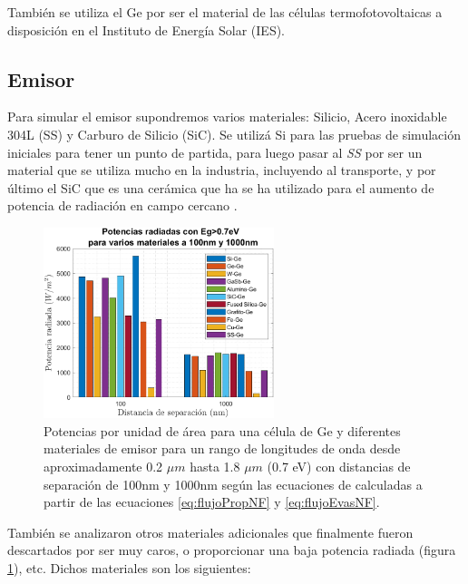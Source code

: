 También se utiliza el Ge por ser el material de las células termofotovoltaicas a disposición en el Instituto de Energía Solar (IES).
\subsection{Emisor}
Para simular el emisor supondremos varios materiales: Silicio, Acero inoxidable 304L (SS) y Carburo de Silicio (SiC). Se utilizá Si para las pruebas de simulación iniciales para tener un punto de partida, para luego pasar al \textit{SS} por ser un material que se utiliza mucho en la industria, incluyendo al transporte, y por último el SiC que es una cerámica que ha se ha utilizado para el aumento de potencia de radiación en campo cercano \cite{doi:Near_field_ThinFilm}.
\begin{figure}[H]
	\centering
		\includegraphics[width=0.6\textwidth]{figuras/rad_mat/EgRad.png}
	\caption{Potencias por unidad de área para una célula de Ge y diferentes materiales de emisor para un rango de longitudes de onda desde aproximadamente 0.2 $\mu m$ hasta 1.8 $\mu m$ (0.7 eV) con distancias de separación de 100nm y 1000nm según las ecuaciones de \cite{nfTPV_equations} calculadas a partir de las ecuaciones \eqref{eq:flujoPropNF} y \eqref{eq:flujoEvasNF}.}
	\label{fig:EgRad}
\end{figure}
También se analizaron otros materiales adicionales que finalmente fueron descartados por ser muy caros, o proporcionar una baja potencia radiada (figura \ref{fig:EgRad}), etc. %
Dichos materiales son los siguientes:

